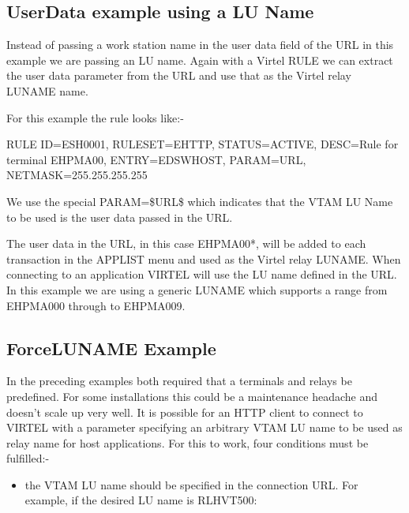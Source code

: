 \documentclass[letterpaper,10pt,english]{sphinxmanual}
\begin{document}

\subsection{UserData example using a LU Name}
\label{\detokenize{connectivity_guide:index-151}}\label{\detokenize{connectivity_guide:userdata-example-using-a-lu-name}}
Instead of passing a work station name in the user data field of the URL in this example we are passing an LU name. Again with a Virtel RULE we can extract the user data parameter from the URL and use that as the Virtel relay LUNAME name.


For this example the rule looks like:-

\begin{sphinxVerbatim}[commandchars=\\\{\}]
RULE ID=ESH0001,
RULESET=E\PYGZhy{}HTTP,
STATUS=ACTIVE,
DESC=\PYGZsq{}Rule for terminal EHPMA00\PYGZsq{},
ENTRY=EDSWHOST,
PARAM=\PYGZdl{}URL\PYGZdl{},
NETMASK=255.255.255.255
\end{sphinxVerbatim}

We use the special PARAM=\$URL\$ which indicates that the VTAM LU Name to be used is the user data passed in the URL.



The user data in the URL, in this case EHPMA00*, will be added to each transaction in the APPLIST menu and used as the Virtel relay LUNAME. When connecting to an application VIRTEL will use the LU name defined in the URL. In this example we are using a generic LUNAME which supports a range from EHPMA000 through to EHPMA009.


\subsection{ForceLUNAME Example}
\label{\detokenize{connectivity_guide:index-152}}\label{\detokenize{connectivity_guide:forceluname-example}}
In the preceding examples both required that a terminals and relays be predefined. For some installations this could be a maintenance headache and doesn’t scale up very well. It is possible for an HTTP client to connect to VIRTEL with a parameter specifying an arbitrary VTAM LU name to be used as relay name for host applications. For this to work, four conditions must be fulfilled:-
\begin{itemize}
\item {} 
the VTAM LU name should be specified in the connection URL. For example, if the desired LU name is RLHVT500:

\end{itemize}
\end{document}
